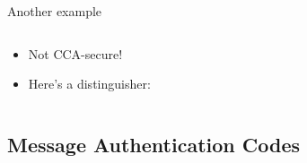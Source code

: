 \documentclass[aspectratio=169, lualatex, handout]{beamer}
\begin{document}
\begin{frame}{Another example}
	\begin{columns}[c]
		\begin{column}{0.5\textwidth}
			\begin{itemize}
				\item Not CCA-secure!
				\item Here's a distinguisher:
			\end{itemize}
		\end{column}
		\begin{column}{0.5\textwidth}
		\end{column}
	\end{columns}
\end{frame}

\subsection{Message Authentication Codes}
\end{document}
